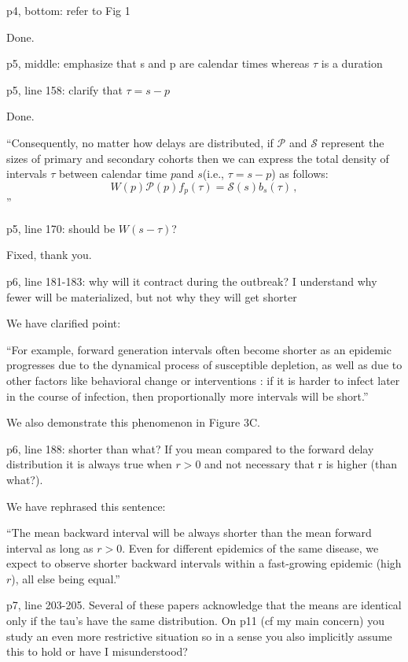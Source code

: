 \documentclass[12pt]{article}
\newcommand{\revtext}{\textsf}
\newcommand{\psymp}{\ensuremath{p}} %
\newcommand{\ssymp}{\ensuremath{s}} %
\newcommand{\psize}{{\mathcal P}} %
\newcommand{\ssize}{{\mathcal S}} %
\begin{document}
\revtext{p4, bottom: refer to Fig 1 }

Done.

\revtext{p5, middle: emphasize that s and p are calendar times whereas $\tau$ is a duration }

\revtext{p5, line 158: clarify that $\tau = s-p$}

Done.

``Consequently, no matter how delays are distributed, if
$\mathcal P$ and $\mathcal S$ represent the sizes of primary and
secondary cohorts then we can express the total density of intervals $\tau$ between calendar time \psymp and \ssymp (i.e., $\tau=\ssymp-\psymp$) as follows:
\begin{equation}
W(\psymp) \psize(\psymp) f_\psymp(\tau) = \ssize(\ssymp) b_\ssymp(\tau) \,,
\label{eq:match}
\end{equation}''

\revtext{p5, line 170: should be $W(s-\tau)$?}

Fixed, thank you.

\revtext{p6, line 181-183: why will it contract during the outbreak? I understand why fewer will be materialized, but not why they will get shorter}

We have clarified point:

``For example, forward generation intervals often become shorter as an epidemic progresses due to the dynamical process of susceptible depletion, as well as due to other factors like behavioral change or interventions \citep{kenah2008generation, nishiura2010time, champredon2015intrinsic}: if it is harder to infect later in the course of infection, then proportionally more intervals will be short.''

We also demonstrate this phenomenon in Figure 3C.

\revtext{p6, line 188: shorter than what? If you mean compared to the forward delay distribution it is always true when $r>0$ and not necessary that r is higher (than what?).}

We have rephrased this sentence:

``The mean backward interval will be always shorter than the mean forward interval as long as $r > 0$.
Even for different epidemics of the same disease, we expect to observe shorter backward intervals within a fast-growing epidemic (high $r$), all else being equal.''

\revtext{p7, line 203-205. Several of these papers acknowledge that the means are identical only if the tau's have the same distribution. On p11 (cf my main concern) you study an even more restrictive situation so in a sense you also implicitly assume this to hold or have I misunderstood?}
\end{document}
